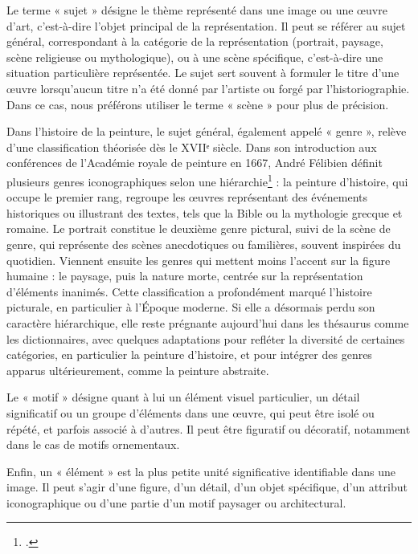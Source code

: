 Le terme « sujet » désigne le thème représenté dans une image ou une œuvre d’art, c’est-à-dire l’objet principal de la représentation. Il peut se référer au sujet général, correspondant à la catégorie de la représentation (portrait, paysage, scène religieuse ou mythologique), ou à une scène spécifique, c’est-à-dire une situation particulière représentée. Le sujet sert souvent à formuler le titre d’une œuvre lorsqu’aucun titre n’a été donné par l’artiste ou forgé par l’historiographie. Dans ce cas, nous préférons utiliser le terme « scène » pour plus de précision.

Dans l’histoire de la peinture, le sujet général, également appelé « genre », relève d’une classification théorisée dès le XVIIᵉ siècle. Dans son introduction aux conférences de l’Académie royale de peinture en 1667, André Félibien définit plusieurs genres iconographiques selon une hiérarchie\footcite{felibienConferencesLAcademieRoyale1667} : la peinture d’histoire, qui occupe le premier rang, regroupe les œuvres représentant des événements historiques ou illustrant des textes, tels que la Bible ou la mythologie grecque et romaine. Le portrait constitue le deuxième genre pictural, suivi de la scène de genre, qui représente des scènes anecdotiques ou familières, souvent inspirées du quotidien. Viennent ensuite les genres qui mettent moins l’accent sur la figure humaine : le paysage, puis la nature morte, centrée sur la représentation d’éléments inanimés. Cette classification a profondément marqué l’histoire picturale, en particulier à l’Époque moderne. Si elle a désormais perdu son caractère hiérarchique, elle reste prégnante aujourd’hui dans les thésaurus comme les dictionnaires, avec quelques adaptations pour refléter la diversité de certaines catégories, en particulier la peinture d’histoire, et pour intégrer des genres apparus ultérieurement, comme la peinture abstraite.

Le « motif » désigne quant à lui un élément visuel particulier, un détail significatif ou un groupe d’éléments dans une œuvre, qui peut être isolé ou répété, et parfois associé à d’autres. Il peut être figuratif ou décoratif, notamment dans le cas de motifs ornementaux. 

Enfin, un « élément » est la plus petite unité significative identifiable dans une image. Il peut s’agir d’une figure, d’un détail, d’un objet spécifique, d’un attribut iconographique ou d’une partie d’un motif paysager ou architectural.

